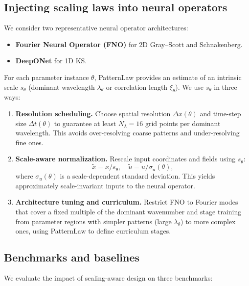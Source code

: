 \documentclass{article}
\theoremstyle{plain}
\theoremstyle{definition}
\theoremstyle{remark}
\begin{document}
\subsection{Injecting scaling laws into neural operators}

We consider two representative neural operator architectures:

\begin{itemize}
    \item \textbf{Fourier Neural Operator (FNO)} \citep{Li2021FNO} for 2D Gray--Scott and Schnakenberg.
    \item \textbf{DeepONet} \citep{Lu2021DeepONet} for 1D KS.
\end{itemize}

For each parameter instance $\theta$, PatternLaw provides an estimate of an intrinsic scale $s_\theta$ (dominant wavelength $\lambda_\theta$ or correlation length $\xi_\theta$). We use $s_\theta$ in three ways:

\begin{enumerate}
    \item \textbf{Resolution scheduling.} Choose spatial resolution $\Delta x(\theta)$ and time-step size $\Delta t(\theta)$ to guarantee at least $N_\lambda=16$ grid points per dominant wavelength. This avoids over-resolving coarse patterns and under-resolving fine ones.
    \item \textbf{Scale-aware normalization.} Rescale input coordinates and fields using $s_\theta$:
    \begin{equation}
        \tilde{x} = x / s_\theta, \quad \tilde{u} = u / \sigma_u(\theta),
    \end{equation}
    where $\sigma_u(\theta)$ is a scale-dependent standard deviation. This yields approximately scale-invariant inputs to the neural operator.
    \item \textbf{Architecture tuning and curriculum.} Restrict FNO to Fourier modes that cover a fixed multiple of the dominant wavenumber and stage training from parameter regions with simpler patterns (large $\lambda_\theta$) to more complex ones, using PatternLaw to define curriculum stages.
\end{enumerate}

\subsection{Benchmarks and baselines}

We evaluate the impact of scaling-aware design on three benchmarks:
\end{document}
